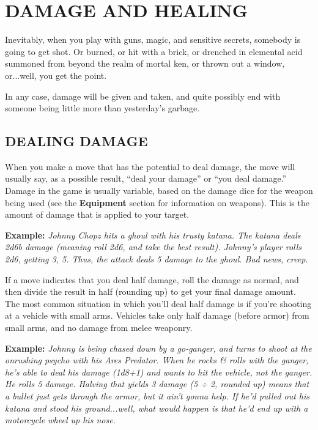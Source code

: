 \documentclass[oneside,10pt]{article}
\begin{document}
\section{DAMAGE AND HEALING}
\begin{multicols}{2}

  Inevitably, when you play with guns, magic, and sensitive secrets,
  somebody is going to get shot. Or burned, or hit with a brick, or
  drenched in elemental acid summoned from beyond the realm of mortal
  ken, or thrown out a window, or...well, you get the point.

  In any case, damage will be given and taken, and quite possibly end
  with someone being little more than yesterday’s garbage.

\subsection{DEALING DAMAGE}

When you make a move that has the potential to deal damage, the move
will usually say, as a possible result, ``deal your damage'' or ``you
deal damage.'' Damage in the game is usually variable, based on the
damage dice for the weapon being used (see the \textbf{Equipment}
section for information on weapons). This is the amount of damage that
is applied to your target.

\begin{dent}

  \textbf{Example:} \textit{Johnny Chopz hits a ghoul with his trusty
    katana. The katana deals 2d6b damage (meaning roll 2d6, and take
    the best result). Johnny’s player rolls 2d6, getting 3, 5. Thus,
    the attack deals 5 damage to the ghoul. Bad news, creep.}
\end{dent}

If a move indicates that you deal half damage, roll the damage as
normal, and then divide the result in half (rounding up) to get your
final damage amount.  The most common situation in which you’ll deal
half damage is if you’re shooting at a vehicle with small
arms. Vehicles take only half damage (before armor) from small arms,
and no damage from melee weaponry.

\begin{dent}

  \textbf{Example:} \textit{Johnny is being chased down by a
    go-ganger, and turns to shoot at the onrushing psycho with his
    Ares Predator. When he rocks \& rolls with the ganger, he’s able
    to deal his damage (1d8+1) and wants to hit the vehicle, not the
    ganger. He rolls 5 damage. Halving that yields 3 damage (5 ÷ 2,
    rounded up) means that a bullet just gets through the armor, but
    it ain’t gonna help. If he’d pulled out his katana and stood his
    ground...well, what would happen is that he’d end up with a
    motorcycle wheel up his nose.}
\end{dent}


\end{multicols}
\end{document}
